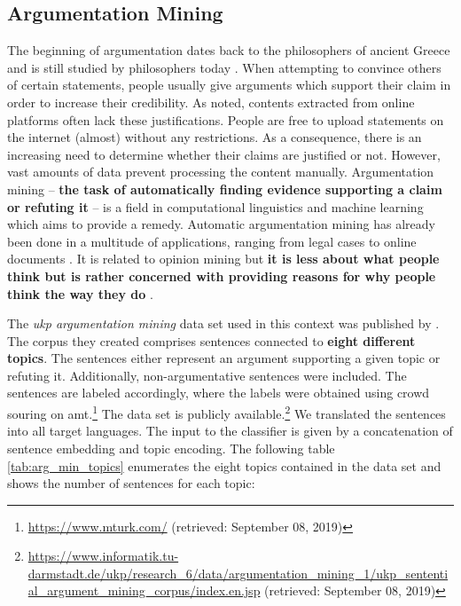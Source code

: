 \subsection{Argumentation Mining}
\label{sec:arg_min}

 The beginning of argumentation dates back to the philosophers of ancient Greece and is still studied by philosophers today \citep{Moens.2013}. When attempting to convince others of certain statements, people usually give arguments which support their claim in order to increase their credibility. As \citep{Park.2014} noted, contents extracted from online platforms often lack these justifications. People are free to upload statements on the internet (almost) without any restrictions. As a consequence, there is an increasing need to determine whether their claims are justified or not. However, vast amounts of data prevent processing the content manually. Argumentation mining -- \textbf{the task of automatically finding evidence supporting a claim or refuting it} -- is a field in computational linguistics and machine learning which aims to provide a remedy. Automatic argumentation mining has already been done in a multitude of applications, ranging from legal cases \citep{Moens.2007, Palau.2011} to online documents \citep{Boltuzic.2014}. It is related to opinion mining but \textbf{it is less about what people think but is rather concerned with providing reasons for why people think the way they do} \citep{Habernal.2014}. 



 The \textit{\gls{ukp} argumentation mining} data set used in this context was published by \citep{Stab.2018}. The corpus they created comprises sentences connected to \textbf{eight different topics}. The sentences either represent an argument supporting a given topic or refuting it. Additionally, non-argumentative sentences were included. The sentences are labeled accordingly, where the labels were obtained using crowd souring on \gls{amt}.\footnote{\url{https://www.mturk.com/} (retrieved: September 08, 2019)} The data set is publicly available.\footnote{\url{https://www.informatik.tu-darmstadt.de/ukp/research_6/data/argumentation_mining_1/ukp_sentential_argument_mining_corpus/index.en.jsp} (retrieved: September 08, 2019)} We translated the sentences into all target languages. The input to the classifier is given by a concatenation of sentence embedding and topic encoding. The following table \vref{tab:arg_min_topics} enumerates the eight topics contained in the data set and shows the number of sentences for each topic:

